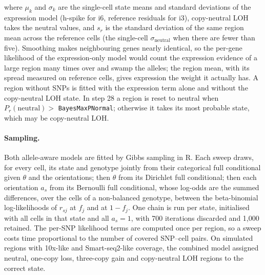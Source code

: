 where $\mu_k$ and $\sigma_k$ are the single-cell state means and standard deviations of the expression model (h-spike for i6, reference residuals for i3), copy-neutral LOH takes the neutral values, and $s_r$ is the standard deviation of the same region mean across the reference cells (the single-cell $\sigma_{\mathrm{neutral}}$ when there are fewer than five). Smoothing makes neighbouring genes nearly identical, so the per-gene likelihood of the expression-only model would count the expression evidence of a large region many times over and swamp the alleles; the region mean, with its spread measured on reference cells, gives expression the weight it actually has. A region without SNPs is fitted with the expression term alone and without the copy-neutral LOH state. In step 28 a region is reset to neutral when $P_r(\text{neutral})>$ \texttt{BayesMaxPNormal}; otherwise it takes its most probable state, which may be copy-neutral LOH.

\paragraph{Sampling.}
Both allele-aware models are fitted by Gibbs sampling in R. Each sweep draws, for every cell, its state and genotype jointly from their categorical full conditional given $\theta$ and the orientations; then $\theta$ from its Dirichlet full conditional; then each orientation $a_s$ from its Bernoulli full conditional, whose log-odds are the summed differences, over the cells of a non-balanced genotype, between the beta-binomial log-likelihoods of $r_{sj}$ at $f_j$ and at $1-f_j$. One chain is run per state, initialised with all cells in that state and all $a_s=1$, with 700 iterations discarded and 1,000 retained. The per-SNP likelihood terms are computed once per region, so a sweep costs time proportional to the number of covered SNP--cell pairs. On simulated regions with 10x-like and Smart-seq2-like coverage, the combined model assigned neutral, one-copy loss, three-copy gain and copy-neutral LOH regions to the correct state.

